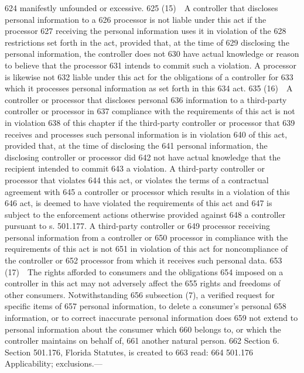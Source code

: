   624  manifestly unfounded or excessive.
  625         (15) A controller that discloses personal information to a
  626  processor is not liable under this act if the processor
  627  receiving the personal information uses it in violation of the
  628  restrictions set forth in the act, provided that, at the time of
  629  disclosing the personal information, the controller does not
  630  have actual knowledge or reason to believe that the processor
  631  intends to commit such a violation. A processor is likewise not
  632  liable under this act for the obligations of a controller for
  633  which it processes personal information as set forth in this
  634  act.
  635         (16) A controller or processor that discloses personal
  636  information to a third-party controller or processor in
  637  compliance with the requirements of this act is not in violation
  638  of this chapter if the third-party controller or processor that
  639  receives and processes such personal information is in violation
  640  of this act, provided that, at the time of disclosing the
  641  personal information, the disclosing controller or processor did
  642  not have actual knowledge that the recipient intended to commit
  643  a violation. A third-party controller or processor that violates
  644  this act, or violates the terms of a contractual agreement with
  645  a controller or processor which results in a violation of this
  646  act, is deemed to have violated the requirements of this act and
  647  is subject to the enforcement actions otherwise provided against
  648  a controller pursuant to s. 501.177. A third-party controller or
  649  processor receiving personal information from a controller or
  650  processor in compliance with the requirements of this act is not
  651  in violation of this act for noncompliance of the controller or
  652  processor from which it receives such personal data.
  653         (17) The rights afforded to consumers and the obligations
  654  imposed on a controller in this act may not adversely affect the
  655  rights and freedoms of other consumers. Notwithstanding
  656  subsection (7), a verified request for specific items of
  657  personal information, to delete a consumer’s personal
  658  information, or to correct inaccurate personal information does
  659  not extend to personal information about the consumer which
  660  belongs to, or which the controller maintains on behalf of,
  661  another natural person.
  662         Section 6. Section 501.176, Florida Statutes, is created to
  663  read:
  664         501.176 Applicability; exclusions.—

